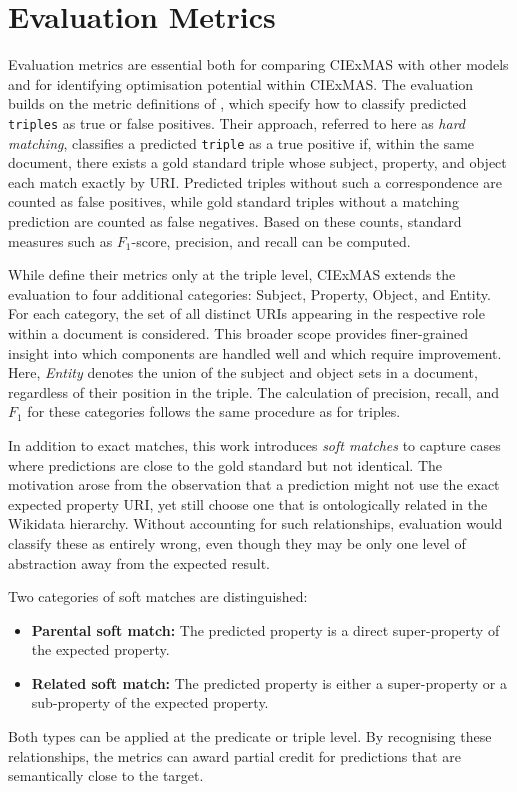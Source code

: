 \documentclass[a4paper,oneside,bibliography=totoc]{scrbook}
\begin{document}
\section{Evaluation Metrics}
\label{sec:evaluation_metrics}

Evaluation metrics are essential both for comparing CIExMAS with other models and for identifying optimisation potential within CIExMAS. The evaluation builds on the metric definitions of \citet{Josifoski2021}, which specify how to classify predicted \texttt{triples} as true or false positives. Their approach, referred to here as \emph{hard matching}, classifies a predicted \texttt{triple} as a true positive if, within the same document, there exists a gold standard triple whose subject, property, and object each match exactly by \ac{URI}. Predicted triples without such a correspondence are counted as false positives, while gold standard triples without a matching prediction are counted as false negatives. Based on these counts, standard measures such as $F_1$-score, precision, and recall can be computed.

While \citet{Josifoski2021} define their metrics only at the triple level, CIExMAS extends the evaluation to four additional categories: Subject, Property, Object, and Entity. For each category, the set of all distinct \acp{URI} appearing in the respective role within a document is considered. This broader scope provides finer-grained insight into which components are handled well and which require improvement. Here, \emph{Entity} denotes the union of the subject and object sets in a document, regardless of their position in the triple. The calculation of precision, recall, and $F_1$ for these categories follows the same procedure as for triples.

In addition to exact matches, this work introduces \emph{soft matches} to capture cases where predictions are close to the gold standard but not identical. The motivation arose from the observation that a prediction might not use the exact expected property \ac{URI}, yet still choose one that is ontologically related in the Wikidata hierarchy. Without accounting for such relationships, evaluation would classify these as entirely wrong, even though they may be only one level of abstraction away from the expected result.

Two categories of soft matches are distinguished:
\begin{itemize}
  \item \textbf{Parental soft match:} The predicted property is a direct super-property of the expected property.
  \item \textbf{Related soft match:} The predicted property is either a super-property or a sub-property of the expected property.
\end{itemize}
Both types can be applied at the predicate or triple level. By recognising these relationships, the metrics can award partial credit for predictions that are semantically close to the target.
\end{document}
